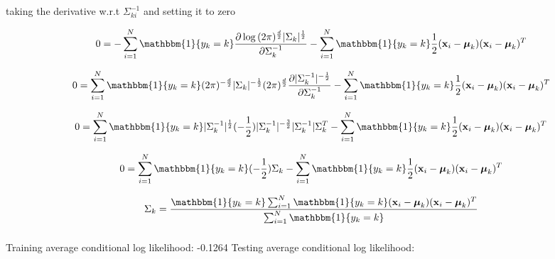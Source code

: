 \documentclass[12pt,letterpaper]{article} %
\newcommand{\bs}[1]{\bm{\mathrm{#1}}} %
\newcommand{\switch}[0]{\mathbbm{1}\{y_k=k\}}
\begin{document}
 taking the derivative w.r.t $\Sigma^{-1}_{ki}$ and setting it to zero
 
 \begin{equation*} 
 0=-\sum^N_{i=1}\switch{}\frac{\partial\log{(2\pi)^{\frac{d}{2}}|\Sigma_k|^{\frac{1}{2}}}}{\partial\Sigma^{-1}_{k}}-\sum^N_{i=1}\switch{}\frac{1}{2}(\bs{x}_i-\bs{\mu}_k)(\bs{x}_i -\bs{\mu}_k)^T 
 \end{equation*}
 
 \begin{equation*} 
 0= \sum^N_{i=1}\switch(2\pi)^{-\frac{d}{2}}|\Sigma_k|^{-\frac{1}{2}}(2\pi)^{\frac{d}{2}}\frac{\partial|\Sigma_{k}^{-1}|^{-\frac{1}{2}}}{\partial\Sigma^{-1}_{k}} - \sum^N_{i=1}\switch{}\frac{1}{2}(\bs{x}_i-\bs{\mu}_k)(\bs{x}_i -\bs{\mu}_k)^T 
 \end{equation*}
 
  \begin{equation*} 
   0 = \sum^N_{i=1}\switch|\Sigma_k^{-1}|^{\frac{1}{2}}(-\frac{1}{2})|\Sigma_k^{-1}|^{-\frac{3}{2}}|\Sigma_{k}^{-1}|\Sigma_{k}^{T}- \sum^N_{i=1}\switch{}\frac{1}{2}(\bs{x}_i-\bs{\mu}_k)(\bs{x}_i -\bs{\mu}_k)^T 
  \end{equation*}

  \begin{equation*} 
   0 = \sum^N_{i=1}\switch(-\frac{1}{2})\Sigma_{k}- \sum^N_{i=1}\switch{}\frac{1}{2}(\bs{x}_i-\bs{\mu}_k)(\bs{x}_i -\bs{\mu}_k)^T 
  \end{equation*}

  \begin{equation*} 
   \Sigma_{k} = \frac{\switch \sum^N_{i=1}\switch{}(\bs{x}_i-\bs{\mu}_k)(\bs{x}_i -\bs{\mu}_k)^T }{\sum^N_{i=1}\switch}
  \end{equation*}
  
   
  
  \subsubsection{}
  
  \subsubsection{}
  Training average conditional log likelihood: -0.1264
  Testing average conditional log likelihood: 
 
\end{document}
